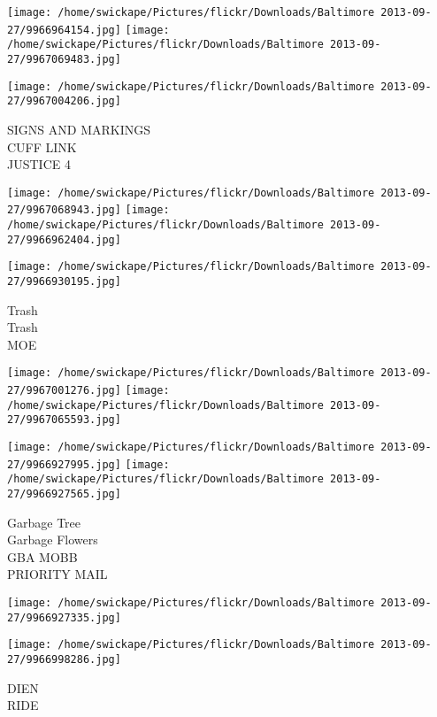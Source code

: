 \documentclass[10pt,letterpaper]{article}
\begin{document}
\texttt{[image: /home/swickape/Pictures/flickr/Downloads/Baltimore 2013-09-27/9966964154.jpg]}
\texttt{[image: /home/swickape/Pictures/flickr/Downloads/Baltimore 2013-09-27/9967069483.jpg]}

\vspace{0.25in}
\texttt{[image: /home/swickape/Pictures/flickr/Downloads/Baltimore 2013-09-27/9967004206.jpg]}

SIGNS AND MARKINGS\\
CUFF LINK\\
JUSTICE 4\\
\pagebreak

\texttt{[image: /home/swickape/Pictures/flickr/Downloads/Baltimore 2013-09-27/9967068943.jpg]}
\texttt{[image: /home/swickape/Pictures/flickr/Downloads/Baltimore 2013-09-27/9966962404.jpg]}

\vspace{0.25in}
\texttt{[image: /home/swickape/Pictures/flickr/Downloads/Baltimore 2013-09-27/9966930195.jpg]}

Trash\\
Trash\\
MOE\\
\pagebreak

\texttt{[image: /home/swickape/Pictures/flickr/Downloads/Baltimore 2013-09-27/9967001276.jpg]}
\texttt{[image: /home/swickape/Pictures/flickr/Downloads/Baltimore 2013-09-27/9967065593.jpg]}

\texttt{[image: /home/swickape/Pictures/flickr/Downloads/Baltimore 2013-09-27/9966927995.jpg]}
\texttt{[image: /home/swickape/Pictures/flickr/Downloads/Baltimore 2013-09-27/9966927565.jpg]}

Garbage Tree\\
Garbage Flowers\\
GBA MOBB\\
PRIORITY MAIL\\
\pagebreak

\texttt{[image: /home/swickape/Pictures/flickr/Downloads/Baltimore 2013-09-27/9966927335.jpg]}

\vspace{0.25in}
\texttt{[image: /home/swickape/Pictures/flickr/Downloads/Baltimore 2013-09-27/9966998286.jpg]}

DIEN\\
RIDE\\
\pagebreak
\end{document}
